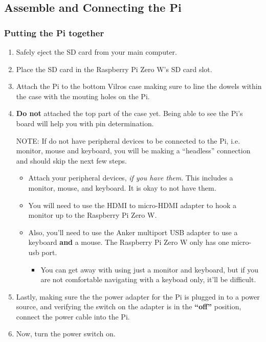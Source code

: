 \documentclass{article}
\begin{document}
\subsection{Assemble and Connecting the Pi}

\subsubsection{Putting the Pi together}

\begin{enumerate}
  \item Safely eject the SD card from your main computer.
  \item Place the SD card in the Raspberry Pi Zero W's SD card slot.
  \item Attach the Pi to the bottom Vilros case making sure to line the dowels within the case with the mouting holes on the Pi.
  \item \textbf{Do not} attached the top part of the case yet. Being able to see the Pi's board will help you with pin determination.
  
NOTE: If do not have peripheral devices to be connected to the Pi, i.e. monitor, mouse and keyboard, you will be making a ``headless'' connection and should skip the next few steps. 
\begin{itemize}
  \item Attach your peripheral devices, \textit{if you have them}. This includes a monitor, mouse, and keyboard. It is okay to not have them.
    \item You will need to use the HDMI to micro-HDMI adapter to hook a monitor up to the Raspberry Pi Zero W.
    \item Also, you'll need to use the Anker multiport USB adapter to use a keyboard \textbf{and} a mouse. The Raspberry Pi Zero W only has one micro-usb port.
    \begin{itemize}
     \item You can get away with using just a monitor and keyboard, but if you are not comfortable navigating with a keyboad only, it'll be difficult.
    \end{itemize}
  \end{itemize}
\item Lastly, making sure the the power adapter for the Pi is plugged in to a power source, and verifying the switch on the adapter is in the \textbf{``off''} position, connect the power cable into the Pi.
  \item Now, turn the power switch on.


\end{enumerate}
\end{document}
